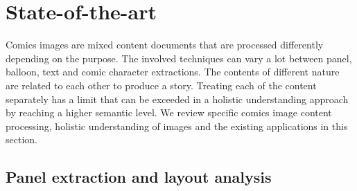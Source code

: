 \chapter{State-of-the-art} %
\label{chap:sota}
\graphicspath{{./chapters/3-state-of-the-art/figs/}}


Comics images are mixed content documents that are processed differently depending on the purpose.
The involved techniques can vary a lot between panel, balloon, text and comic character extractions.
The contents of different nature are related to each other to produce a story.
Treating each of the content separately has a limit that can be exceeded in a holistic understanding approach by reaching a higher semantic level.
We review specific comics image content processing, holistic understanding of images and the existing applications in this section.

\section{Panel extraction and layout analysis}
\label{sec:sota:layout_panel}



